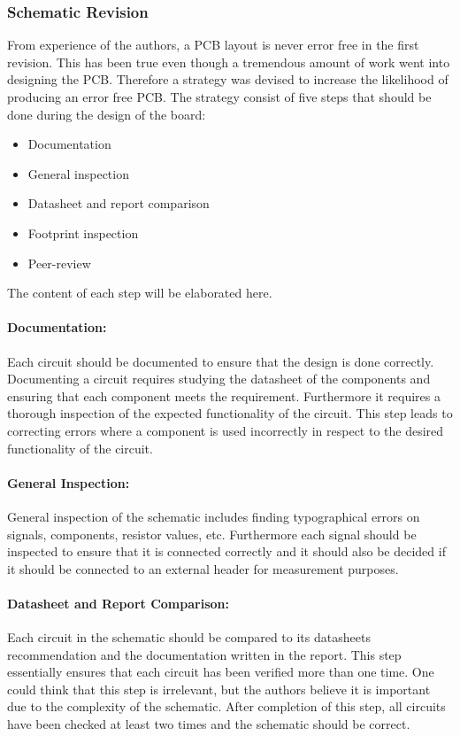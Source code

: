 \subsubsection{Schematic Revision} %
\label{ssub:schematic_revision}

From experience of the authors, a PCB layout is never error free in the first revision. 
This has been true even though a tremendous amount of work went into designing the PCB.
Therefore a strategy was devised to increase the likelihood of producing an error free PCB.
The strategy consist of five steps that should be done during the design of the board:

\begin{itemize}
	\item Documentation
	\item General inspection
	\item Datasheet and report comparison
	\item Footprint inspection 
	\item Peer-review
\end{itemize}

The content of each step will be elaborated here. 

\paragraph{Documentation:}
Each circuit should be documented to ensure that the design is done correctly.
Documenting a circuit requires studying the datasheet of the components and ensuring that each component meets the requirement.
Furthermore it requires a thorough inspection of the expected functionality of the circuit.
This step leads to correcting errors where a component is used incorrectly in respect to the desired functionality of the circuit.

\paragraph{General Inspection:}
General inspection of the schematic includes finding typographical errors on signals, components, resistor values, etc.
Furthermore each signal should be inspected to ensure that it is connected correctly and it should also be decided if it should be connected to an external header for measurement purposes.

\paragraph{Datasheet and Report Comparison:}
Each circuit in the schematic should be compared to its datasheets recommendation and the documentation written in the report. 
This step essentially ensures that each circuit has been verified more than one time. 
One could think that this step is irrelevant, but the authors believe it is important due to the complexity of the schematic.
After completion of this step, all circuits have been checked at least two times and the schematic should be correct. 

